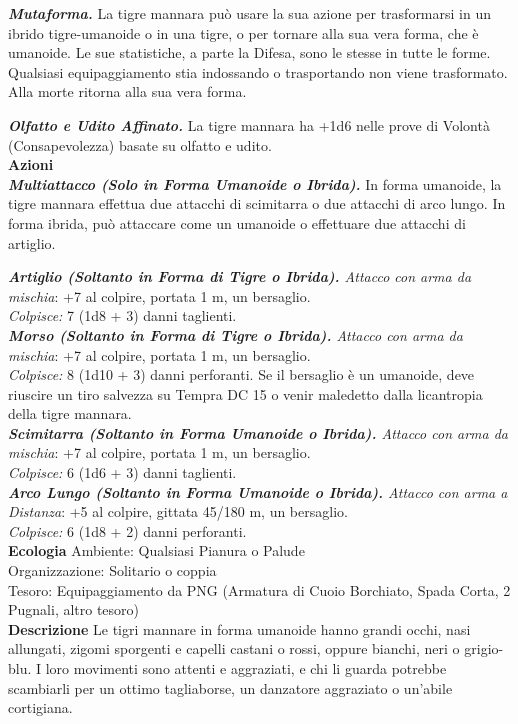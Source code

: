 \begin{multicols}{2}
\emph{\textbf{Mutaforma.}} La tigre mannara può usare la sua azione per trasformarsi in un ibrido tigre-umanoide o in una tigre, o per tornare alla sua vera forma, che è umanoide. Le sue statistiche, a parte la Difesa, sono le stesse in tutte le forme. Qualsiasi equipaggiamento stia indossando o trasportando non viene trasformato. Alla morte ritorna alla sua vera forma.

\emph{\textbf{Olfatto e Udito Affinato.}} La tigre mannara ha +1d6 nelle prove di Volontà (Consapevolezza) basate su olfatto e udito.\\

\smallskip\textbf{Azioni}\\

\emph{\textbf{Multiattacco (Solo in Forma Umanoide o Ibrida).}} In forma umanoide, la tigre mannara effettua due attacchi di scimitarra o due attacchi di arco lungo. In forma ibrida, può attaccare come un umanoide o effettuare due attacchi di artiglio.

\emph{\textbf{Artiglio (Soltanto in Forma di Tigre o Ibrida).} Attacco con arma da mischia}: +7 al colpire, portata 1 m, un bersaglio.\\
\emph{Colpisce:} 7 (1d8 + 3) danni taglienti.\\

\emph{\textbf{Morso (Soltanto in Forma di Tigre o Ibrida).} Attacco con arma da mischia}: +7 al colpire, portata 1 m, un bersaglio.\\
\emph{Colpisce:} 8 (1d10 + 3) danni perforanti. Se il bersaglio è un umanoide, deve riuscire un tiro salvezza su Tempra DC  15 o venir maledetto dalla licantropia della tigre mannara.\\

\emph{\textbf{Scimitarra (Soltanto in Forma Umanoide o Ibrida).} Attacco con arma da mischia}: +7 al colpire, portata 1 m, un bersaglio.\\
\emph{Colpisce:} 6 (1d6 + 3) danni taglienti.\\

\emph{\textbf{Arco Lungo (Soltanto in Forma Umanoide o Ibrida).} Attacco con arma a Distanza}: +5 al colpire, gittata 45/180 m, un bersaglio.\\

\emph{Colpisce:} 6 (1d8 + 2) danni perforanti.\\
\textbf{Ecologia}
Ambiente: Qualsiasi Pianura o Palude\\
Organizzazione: Solitario o coppia\\
Tesoro: Equipaggiamento da PNG (Armatura di Cuoio Borchiato, Spada Corta, 2 Pugnali, altro tesoro)\\
\textbf{Descrizione}
Le tigri mannare in forma umanoide hanno grandi occhi, nasi allungati, zigomi sporgenti e capelli castani o rossi, oppure bianchi, neri o grigio-blu. I loro movimenti sono attenti e aggraziati, e chi li guarda potrebbe scambiarli per un ottimo tagliaborse, un danzatore aggraziato o un’abile cortigiana.\\


\end{multicols}
